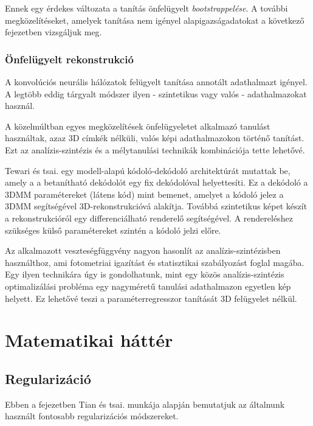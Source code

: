 \documentclass[12pt,a4]{article}
\begin{document}
	Ennek egy érdekes változata
	a tanítás önfelügyelt \textit{bootstrappelése}. A további megközelítéseket, amelyek tanítása nem igényel
	alapigazságadatokat a következő fejezetben vizsgáljuk meg.
	
	\subsubsection{Önfelügyelt rekonstrukció}
	A konvolúciós neurális hálózatok felügyelt tanítása annotált adathalmazt igényel. A legtöbb
	eddig tárgyalt módszer ilyen - szintetikus vagy valós - adathalmazokat használ.
	
	\cite{3dmm}A közelmúltban egyes megközelítések önfelügyeletet alkalmazó
	tanulást használtak, azaz 3D címkék nélküli, valós képi adathalmazokon történő tanítást.
	Ezt az analízis-szintézis és a mélytanulási technikák kombinációja tette lehetővé.
	
	\cite{tewari}Tewari és tsai. egy modell-alapú kódoló-dekódoló architektúrát mutattak be, amely a
	a betanítható dekódolót egy fix dekódolóval helyettesíti. Ez a dekódoló a 3DMM paramétereket (látens kód)
	mint bemenet, amelyet a kódoló jelez a 3DMM segítségével 3D-rekonstrukcióvá alakítja.
	Továbbá szintetikus képet készít a rekonstrukcióról egy differenciálható renderelő segítségével.
	A rendereléshez szükséges külső paramétereket szintén a kódoló jelzi előre. 
	
	\cite{3dmm}Az alkalmazott veszteségfüggvény nagyon hasonlít az analízis-szintézisben használthoz, ami fotometriai igazítást és statisztikai szabályozást foglal magába. Egy ilyen technikára úgy is gondolhatunk, mint egy közös analízis-szintézis optimalizálási probléma egy nagyméretű tanulási
	adathalmazon egyetlen kép helyett. Ez lehetővé teszi a paraméterregresszor tanítását 3D felügyelet nélkül.

    \section{Matematikai háttér}
        \subsection{Regularizáció}

        Ebben a fejezetben \cite{regularization-survey}Tian és tsai. munkája alapján bemutatjuk az általnunk használt fontosabb regularizációs módszereket.
\end{document}
